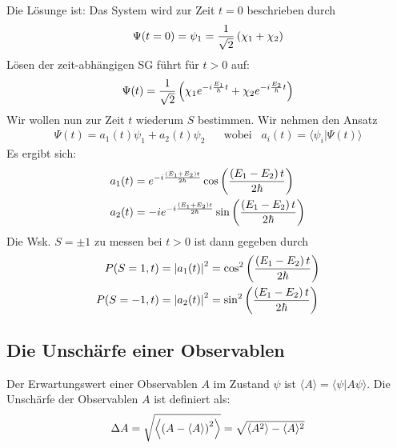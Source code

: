 Die Lösunge ist: Das System wird zur Zeit $t=0$ beschrieben durch
\begin{align*}
    \Psi(t=0) = \psi_1 = \frac{1}{\sqrt{2}} \left( \chi_1 + \chi_2 \right)
\end{align*}
Lösen der zeit-abhängigen SG führt für $t>0$ auf:
\begin{align*}
    \Psi(t) = \frac{1}{\sqrt{2}} \left( \chi_1 e^{-i \frac{E_1}{\hbar} t} + \chi_2 e^{-i \frac{E_2}{\hbar} t} \right)
\end{align*}
Wir wollen nun zur Zeit $t$ wiederum $S$ bestimmen. Wir nehmen den Ansatz
\begin{align*}
    \Psi(t) = a_1 (t) \psi_1 + a_2 (t) \psi_2
    \hspace{20pt} \text{wobei} \hspace{10pt}
    a_i (t) = \langle \psi_i | \Psi(t) \rangle
\end{align*}
Es ergibt sich:
\begin{align*}
    a_1 (t) &= e^{-i \frac{\left( E_1 + E_2 \right) t}{2 \hbar}} \cos \left( \frac{\left( E_1 - E_2 \right) t}{2 \hbar} \right)
    \\
    a_2 (t) &= -i e^{-i \frac{\left( E_1 + E_2 \right) t}{2 \hbar}} \sin \left( \frac{\left( E_1 - E_2 \right) t}{2 \hbar} \right)
\end{align*}
Die Wsk. $S=\pm 1$ zu messen bei $t>0$ ist dann gegeben durch
\begin{align*}
    P(S=1,t) &= \left\vert a_1 (t) \right\vert^2 = \cos^2 \left( \frac{\left( E_1 - E_2 \right) t}{2 \hbar} \right)
    \\
    P(S=-1,t) &= \left\vert a_2 (t) \right\vert^2 = \sin^2 \left( \frac{\left( E_1 - E_2 \right) t}{2 \hbar} \right)
\end{align*}

\subsection{Die Unschärfe einer Observablen}

Der Erwartungswert einer Observablen $A$ im Zustand $\psi$ ist
$\langle A \rangle = \langle \psi | A \psi \rangle$. Die Unschärfe der Observablen
$A$ ist definiert als:
\begin{align*}
    \Delta A = \sqrt{\left\langle \left( A - \langle A \rangle \right)^2 \right\rangle}
    = \sqrt{\left\langle A^2 \right\rangle - \langle A \rangle^2}
\end{align*}

